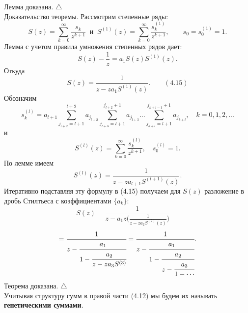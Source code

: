 \documentclass[12pt,a4paper]{article}
\theoremstyle{plain}   \newtheorem{Pro}{Задача}
\begin{document}
Лемма доказана. $ \triangle $ \\
{\Large Доказательство теоремы.}
Рассмотрим степенные ряды:
\begin{equation*}
  S(z)=\sum _{k=0}^{\infty}
    \frac{s_k}{z^{k+1}}
	  \; \; и \; \;
	    S^{(1)}(z)=
		  \sum _{k=0}^{\infty}
		    \frac{s_k ^{(1)}}{z^{k+1}},
			  \qquad s_0 =s_0 ^{(1)} =1.
\end{equation*}
Лемма с учетом правила умножения степенных рядов дает:
$$
  S(z)-\frac{1}{z}=a_1 S(z)S^{(1)}(z).
$$
Откуда
$$
  S(z)=\frac{1}{z-za_1 S^{(1)}(z)}.
  \qquad (4.15)
$$
Обозначим
\begin{equation*}
  s_k ^{(l)}=a_{l+1}
    \sum _{j_{l+2}=l+1}^{l+2}a_{j_{l+2}}
	  \sum _{j_{l+3}=l+1}^{j_{l+2}+1}a_{j_{l+3}}...
	    \sum _{j_{k+l}=l+1}^{j_{k+l-1}+1}a_{j_{k+l}},
		  \quad k=0,1,2,...
\end{equation*}
и
\begin{equation*}
  S^{(l)}(z)=\sum _{k=0}^{\infty}
    \frac{s_k ^{(l)}}{z^{k+1}},
	  \quad s_0 ^{(l)}=1.
\end{equation*}
По лемме имеем
$$
  S^{(l)}(z)=\frac{1}
    {z-za_{l+1}S^{(l+1)}(z)}.
$$
Итеративно подставляя эту формулу в (4.15) получаем для
$ S(z) $
разложение в дробь Стилтьеса с коэффициентами
$ \{ a_k \} : $
$$
  S(z)=
    \frac{1}{z-a_1 z \biggl (
	  \frac{1}{z-za_2 S^{(2)}(z)}
	    \biggr ) } =
$$
$$
   =\cfrac{1}{z-
     \cfrac{a_1}{1-
	   \cfrac{a_2}{z-za_3 S^{(3)}
   }}}=
   \cfrac{1}{z-
     \cfrac{a_1}{1-
	   \cfrac{a_2}{z-
	     \cfrac{a_3}{1-\dotsb
	}}}}.
$$
Теорема доказана. $ \triangle $ \\
Учитывая структуру сумм в правой части (4.12) мы будем
их называть
{\bfseries генетическими суммами}.
\newpage
\end{document}
